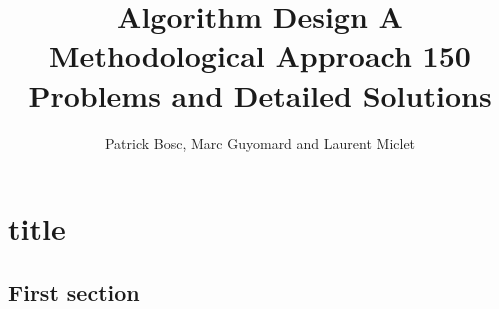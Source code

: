 \documentclass{book}
\begin{document}
\begin{titlepage}
    \title{Algorithm Design
    A Methodological Approach
    150 Problems and Detailed Solutions}
    \author{Patrick Bosc, Marc Guyomard and Laurent Miclet}
    \maketitle
\end{titlepage}
\chapter{title}
\section{First section}
\end{document}
